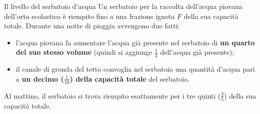 \begin{esercizio}{Il livello del serbatoio d'acqua}
Un serbatoio per la raccolta dell'acqua piovana dell'orto scolastico è riempito fino a una frazione ignota $F$ della sua capacità totale. Durante una notte di pioggia avvengono due fatti:
\begin{itemize}
  \item l'acqua piovana fa aumentare l'acqua già presente nel serbatoio di \textbf{un quarto del suo stesso volume} (quindi si aggiunge $\frac{1}{4}$ dell'acqua già presente);
  \item il canale di gronda del tetto convoglia nel serbatoio una quantità d'acqua pari a \textbf{un decimo ($\frac{1}{10}$) della capacità totale} del serbatoio.
\end{itemize}
Al mattino, il serbatoio si trova riempito esattamente per i tre quinti ($\frac{3}{5}$) della sua capacità totale.

\\

\responsespace{6.5cm}


\end{esercizio}
